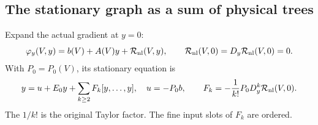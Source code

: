 \documentclass[11pt,reqno]{amsart}
\numberwithin{equation}{section}
\theoremstyle{definition}
\theoremstyle{remark}
\begin{document}
\subsection{The stationary graph as a sum of physical trees}

Expand the actual gradient at \(y=0\):
\[
       \varphi_y(V,y)=b(V)+A(V)y+\mathcal R_{\rm nl}(V,y),
       \qquad
       \mathcal R_{\rm nl}(V,0)
          =D_y\mathcal R_{\rm nl}(V,0)=0 .
\]
With \(P_0=P_0(V)\), its stationary equation is
\begin{equation}
       y=u+E_0y+\sum_{k\ge2}F_k[y,\ldots,y],
       \quad
       u=-P_0b,\qquad
       F_k=-\frac1{k!}P_0D_y^k\mathcal R_{\rm nl}(V,0).
 \label{eq:compatible-physical-tree-equation}
\end{equation}
The \(1/k!\) is the original Taylor factor.
The fine input slots of \(F_k\) are ordered.
\end{document}
